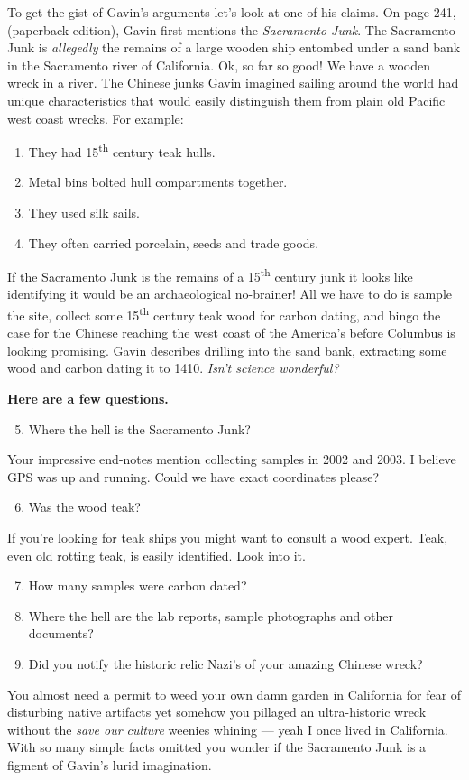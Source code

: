 To get the gist of Gavin's arguments let's look at one of his claims. On
page 241, (paperback edition), Gavin first mentions the \emph{Sacramento
Junk}. The Sacramento Junk is \emph{allegedly} the remains of a large
wooden ship entombed under a sand bank in the Sacramento river of
California. Ok, so far so good! We have a wooden wreck in a river. The
Chinese junks Gavin imagined sailing around the world had unique
characteristics that would easily distinguish them from plain old
Pacific west coast wrecks. For example:

\begin{enumerate}
\tightlist
\item
  They had 15\textsuperscript{th} century teak hulls.
\item
  Metal bins bolted hull compartments together.
\item
  They used silk sails.
\item
  They often carried porcelain, seeds and trade goods.
\end{enumerate}
If the Sacramento Junk is the remains of a 15\textsuperscript{th} century junk it looks
like identifying it would be an archaeological no-brainer! All we have
to do is sample the site, collect some 15\textsuperscript{th} century teak wood for carbon
dating, and bingo the case for the Chinese reaching the west coast of
the America's before Columbus is looking promising. Gavin describes
drilling into the sand bank, extracting some wood and carbon dating it
to 1410. \emph{Isn't science wonderful?}

\textbf{Here are a few questions.}

\begin{enumerate}\setcounter{enumi}{4}
\item
  Where the hell is the Sacramento Junk?
\end{enumerate}
Your impressive end-notes mention collecting samples in 2002 and 2003. I
believe GPS was up and running. Could we have exact coordinates please?

\begin{enumerate}\setcounter{enumi}{5}
\item
  Was the wood teak?
\end{enumerate}
If you're looking for teak ships you might want to consult a wood
expert. Teak, even old rotting teak, is easily identified. Look into it.

\begin{enumerate}\setcounter{enumi}{6}
\tightlist
\item
  How many samples were carbon dated?
\item
  Where the hell are the lab reports, sample photographs and other
  documents?
\item
  Did you notify the historic relic Nazi's of your amazing Chinese
  wreck?
\end{enumerate}
You almost need a permit to weed your own damn garden in California for
fear of disturbing native artifacts yet somehow you pillaged an
ultra-historic wreck without the \emph{save our culture} weenies whining
--- yeah I once lived in California. With so many simple facts omitted
you wonder if the Sacramento Junk is a figment of Gavin's lurid
imagination.

